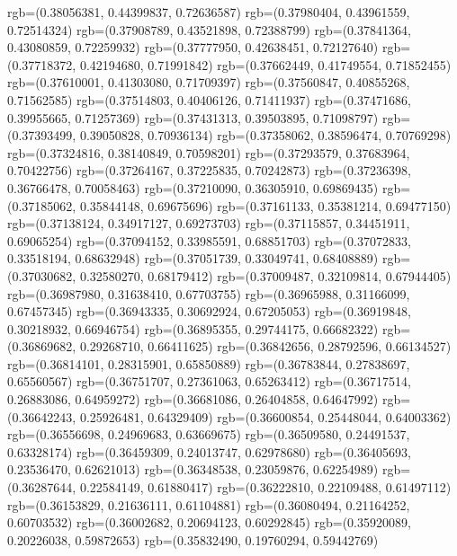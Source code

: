 {{        rgb=(0.38056381, 0.44399837, 0.72636587)
        rgb=(0.37980404, 0.43961559, 0.72514324)
        rgb=(0.37908789, 0.43521898, 0.72388799)
        rgb=(0.37841364, 0.43080859, 0.72259932)
        rgb=(0.37777950, 0.42638451, 0.72127640)
        rgb=(0.37718372, 0.42194680, 0.71991842)
        rgb=(0.37662449, 0.41749554, 0.71852455)
        rgb=(0.37610001, 0.41303080, 0.71709397)
        rgb=(0.37560847, 0.40855268, 0.71562585)
        rgb=(0.37514803, 0.40406126, 0.71411937)
        rgb=(0.37471686, 0.39955665, 0.71257369)
        rgb=(0.37431313, 0.39503895, 0.71098797)
        rgb=(0.37393499, 0.39050828, 0.70936134)
        rgb=(0.37358062, 0.38596474, 0.70769298)
        rgb=(0.37324816, 0.38140849, 0.70598201)
        rgb=(0.37293579, 0.37683964, 0.70422756)
        rgb=(0.37264167, 0.37225835, 0.70242873)
        rgb=(0.37236398, 0.36766478, 0.70058463)
        rgb=(0.37210090, 0.36305910, 0.69869435)
        rgb=(0.37185062, 0.35844148, 0.69675696)
        rgb=(0.37161133, 0.35381214, 0.69477150)
        rgb=(0.37138124, 0.34917127, 0.69273703)
        rgb=(0.37115857, 0.34451911, 0.69065254)
        rgb=(0.37094152, 0.33985591, 0.68851703)
        rgb=(0.37072833, 0.33518194, 0.68632948)
        rgb=(0.37051739, 0.33049741, 0.68408889)
        rgb=(0.37030682, 0.32580270, 0.68179412)
        rgb=(0.37009487, 0.32109814, 0.67944405)
        rgb=(0.36987980, 0.31638410, 0.67703755)
        rgb=(0.36965988, 0.31166099, 0.67457345)
        rgb=(0.36943335, 0.30692924, 0.67205053)
        rgb=(0.36919848, 0.30218932, 0.66946754)
        rgb=(0.36895355, 0.29744175, 0.66682322)
        rgb=(0.36869682, 0.29268710, 0.66411625)
        rgb=(0.36842656, 0.28792596, 0.66134527)
        rgb=(0.36814101, 0.28315901, 0.65850889)
        rgb=(0.36783844, 0.27838697, 0.65560567)
        rgb=(0.36751707, 0.27361063, 0.65263412)
        rgb=(0.36717514, 0.26883086, 0.64959272)
        rgb=(0.36681086, 0.26404858, 0.64647992)
        rgb=(0.36642243, 0.25926481, 0.64329409)
        rgb=(0.36600854, 0.25448044, 0.64003362)
        rgb=(0.36556698, 0.24969683, 0.63669675)
        rgb=(0.36509580, 0.24491537, 0.63328174)
        rgb=(0.36459309, 0.24013747, 0.62978680)
        rgb=(0.36405693, 0.23536470, 0.62621013)
        rgb=(0.36348538, 0.23059876, 0.62254989)
        rgb=(0.36287644, 0.22584149, 0.61880417)
        rgb=(0.36222810, 0.22109488, 0.61497112)
        rgb=(0.36153829, 0.21636111, 0.61104881)
        rgb=(0.36080494, 0.21164252, 0.60703532)
        rgb=(0.36002682, 0.20694123, 0.60292845)
        rgb=(0.35920089, 0.20226038, 0.59872653)
        rgb=(0.35832490, 0.19760294, 0.59442769)
}}
